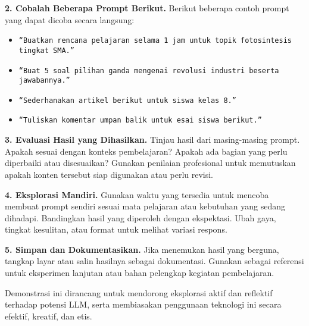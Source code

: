 \textbf{2. Cobalah Beberapa Prompt Berikut.} Berikut beberapa contoh prompt yang dapat dicoba secara langsung:
\begin{itemize}
	\centering
	\item \texttt{“Buatkan rencana pelajaran selama 1 jam untuk topik fotosintesis ting\-kat SMA.”}
	\item \texttt{“Buat 5 soal pilihan ganda mengenai revolusi industri be\-ser\-ta ja\-wab\-an\-nya\-.”}
	\item \texttt{“Sederhanakan artikel berikut untuk siswa kelas 8.”}
	\item \texttt{“Tuliskan komentar umpan balik untuk esai siswa berikut.”}
\end{itemize}


\textbf{3. Evaluasi Hasil yang Dihasilkan.} Tinjau hasil dari masing-masing prompt. Apakah sesuai dengan konteks pembelajaran? Apakah ada bagian yang perlu diperbaiki atau disesuaikan? Gunakan penilaian profesional untuk memutuskan apakah konten tersebut siap digunakan atau perlu revisi.


\textbf{4. Eksplorasi Mandiri.} Gunakan waktu yang tersedia untuk mencoba membuat prompt sendiri sesuai mata pelajaran atau kebutuhan yang sedang dihadapi. Bandingkan hasil yang diperoleh dengan ekspektasi. Ubah gaya, tingkat kesulitan, atau format untuk melihat variasi respons.


\textbf{5. Simpan dan Dokumentasikan.} Jika menemukan hasil yang berguna, tangkap layar atau salin hasilnya sebagai dokumentasi. Gunakan sebagai referensi untuk eksperimen lanjutan atau bahan pelengkap kegiatan pembelajaran.


Demonstrasi ini dirancang untuk mendorong eksplorasi aktif dan reflektif terhadap potensi LLM, serta membiasakan penggunaan teknologi ini secara efektif, kreatif, dan etis.



